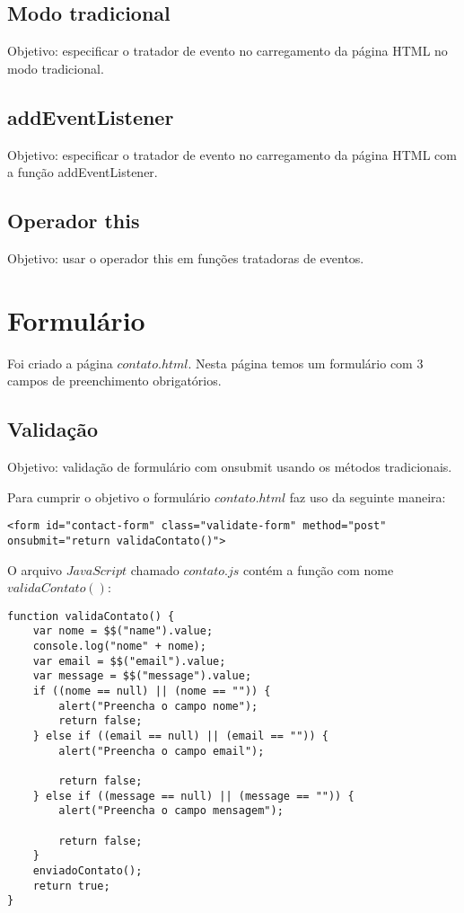 \subsection{Modo tradicional}
Objetivo: especificar o tratador de evento no carregamento da página HTML no modo tradicional.


\subsection{addEventListener}
 Objetivo: especificar o tratador de evento no carregamento da página HTML com a função addEventListener.
 
\subsection{Operador this}
 Objetivo: usar o operador this em funções tratadoras de eventos.
 
 


\section{Formulário}
	Foi criado a página $contato.html$. Nesta página temos um formulário com $3$ campos de preenchimento obrigatórios.
	
\subsection{Validação}
	Objetivo: validação de formulário com onsubmit usando os métodos tradicionais.
	
	Para cumprir o objetivo o formulário $contato.html$ faz uso da seguinte maneira:
\begin{lstlisting}
<form id="contact-form" class="validate-form" method="post" onsubmit="return validaContato()">
\end{lstlisting}

	O arquivo $JavaScript$ chamado $contato.js$ contém a função com nome $validaContato()$:
\begin{lstlisting}
function validaContato() {
    var nome = $$("name").value;
    console.log("nome" + nome);
    var email = $$("email").value;
    var message = $$("message").value;
    if ((nome == null) || (nome == "")) {
        alert("Preencha o campo nome");
        return false;
    } else if ((email == null) || (email == "")) {
        alert("Preencha o campo email");

        return false;
    } else if ((message == null) || (message == "")) {
        alert("Preencha o campo mensagem");

        return false;
    }
    enviadoContato();
    return true;
}
\end{lstlisting}
	

